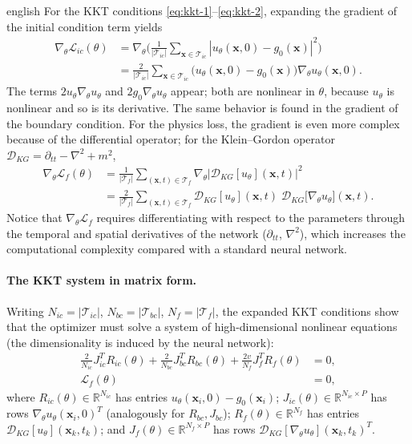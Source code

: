 \documentclass[12pt,letterpaper,twoside]{book}
\newcommand{\abs}[1]{\left\lvert #1 \right\rvert}
\newcommand{\Loss}{\mathcal{L}}
\newcommand{\T}{\mathcal{T}}
\begin{document}
\begin{hyphenrules}{english}
For the KKT conditions \eqref{eq:kkt-1}--\eqref{eq:kkt-2}, expanding the gradient of the initial
condition term yields
\begin{align}
  \nabla_\theta\Loss_{ic}(\theta)
  &=\nabla_\theta\Big(\frac{1}{\abs{\T_{ic}}}\sum_{\mathbf{x}\in\T_{ic}}\abs{u_\theta(\mathbf{x},0)-g_0(\mathbf{x})}^2\Big) \label{eq:grad-ic-1}\\
  &=\frac{2}{\abs{\T_{ic}}}\sum_{\mathbf{x}\in\T_{ic}}\big(u_\theta(\mathbf{x},0)-g_0(\mathbf{x})\big)\nabla_\theta u_\theta(\mathbf{x},0). \label{eq:grad-ic-2}
\end{align}
The terms $2u_\theta\nabla_\theta u_\theta$ and $2g_0\nabla_\theta u_\theta$ appear; both are nonlinear in
$\theta$, because $u_\theta$ is nonlinear and so is its derivative. The same behavior is found in the
gradient of the boundary condition. For the physics loss, the gradient is even more complex because of
the differential operator; for the Klein--Gordon operator
$\mathcal{D}_{KG}=\partial_{tt}-\nabla^2+m^2$,
\begin{align}
  \nabla_\theta\Loss_f(\theta)
  &=\frac{1}{\abs{\T_f}}\sum_{(\mathbf{x},t)\in\T_f}\nabla_\theta\abs{\mathcal{D}_{KG}[u_\theta](\mathbf{x},t)}^2 \label{eq:grad-f-1}\\
  &=\frac{2}{\abs{\T_f}}\sum_{(\mathbf{x},t)\in\T_f}\mathcal{D}_{KG}[u_\theta](\mathbf{x},t)\;
    \mathcal{D}_{KG}\big[\nabla_\theta u_\theta\big](\mathbf{x},t). \label{eq:grad-f-2}
\end{align}
Notice that $\nabla_\theta\Loss_f$ requires differentiating with respect to the parameters through the
temporal and spatial derivatives of the network ($\partial_{tt}$, $\nabla^2$), which increases the
computational complexity compared with a standard neural network.

\paragraph{The KKT system in matrix form.}
Writing $N_{ic}=\abs{\T_{ic}}$, $N_{bc}=\abs{\T_{bc}}$, $N_f=\abs{\T_f}$, the expanded KKT conditions
show that the optimizer must solve a system of high-dimensional nonlinear equations (the
dimensionality is induced by the neural network):
\begin{align}
  \frac{2}{N_{ic}}J_{ic}^{T}R_{ic}(\theta)+\frac{2}{N_{bc}}J_{bc}^{T}R_{bc}(\theta)
  +\frac{2v}{N_f}J_f^{T}R_f(\theta)&=0, \label{eq:kkt-matrix-1}\\
  \Loss_f(\theta)&=0, \label{eq:kkt-matrix-2}
\end{align}
where $R_{ic}(\theta)\in\mathbb{R}^{N_{ic}}$ has entries $u_\theta(\mathbf{x}_i,0)-g_0(\mathbf{x}_i)$;
$J_{ic}(\theta)\in\mathbb{R}^{N_{ic}\times P}$ has rows $\nabla_\theta u_\theta(\mathbf{x}_i,0)^{T}$ (analogously for
$R_{bc},J_{bc}$); $R_f(\theta)\in\mathbb{R}^{N_f}$ has entries $\mathcal{D}_{KG}[u_\theta](\mathbf{x}_k,t_k)$; and
$J_f(\theta)\in\mathbb{R}^{N_f\times P}$ has rows $\mathcal{D}_{KG}[\nabla_\theta u_\theta](\mathbf{x}_k,t_k)^{T}$.


\end{hyphenrules}
\end{document}
